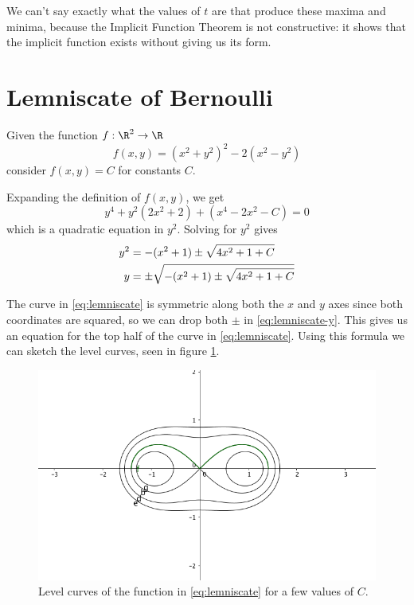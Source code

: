 \documentclass[letterpaper,11pt]{article}
\begin{document}
We can't say exactly what the values of $t$ are that produce these maxima and
minima, because the Implicit Function Theorem is not constructive: it shows
that the implicit function exists without giving us its form.

\section{Lemniscate of Bernoulli}

Given the function $f : \R^2 \to \R$
\begin{equation}
    f(x, y) = (x^2 + y^2)^2 - 2(x^2 - y^2)
    \label{eq:lemniscate}
\end{equation}
consider $f(x, y) = C$ for constants $C$.

Expanding the definition of $f(x, y)$, we get
\begin{equation*}
    y^4 + y^2(2x^2 + 2) + (x^4 - 2x^2 - C) = 0
\end{equation*}
which is a quadratic equation in $y^2$. Solving for $y^2$ gives
\begin{align}
    y^2 &= -(x^2 + 1) \pm \sqrt{4x^2 + 1 + C} \notag \\
    y &= \pm \sqrt{-(x^2 + 1) \pm \sqrt{4x^2 + 1 + C}} \label{eq:lemniscate-y}
\end{align}

The curve in \eqref{eq:lemniscate} is symmetric along both the $x$ and $y$
axes since both coordinates are squared, so we can drop both $\pm$ in
\eqref{eq:lemniscate-y}. This gives us an equation for the top half of the
curve in \eqref{eq:lemniscate}. Using this formula we can sketch the level
curves, seen in figure \ref{fig:lemniscate-level-curves}.

\begin{figure}[ht]
    \includegraphics[width=\textwidth]{lemniscate-level-curves.png}
    \caption{
        Level curves of the function in \eqref{eq:lemniscate} for a few values
        of $C$.
    }
    \label{fig:lemniscate-level-curves}
\end{figure}
\end{document}
